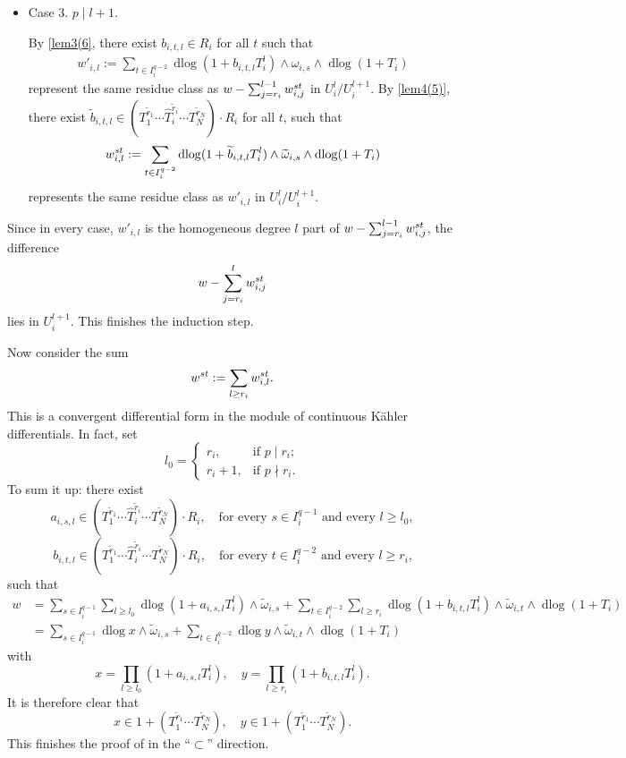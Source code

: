 \documentclass[11pt]{amsart}
\newcommand{\dlog}{\operatorname{dlog}}
\renewcommand{\hat}{\widehat}
\renewcommand{\tilde}{\widetilde}
\theoremstyle{plain}
\theoremstyle{definition}
\numberwithin{equation}{prop}
\begin{document}
\begin{itemize}
\item 
Case 3. $p\mid l+1.$

By \eqref{lem3(6},
there exist $b_{i,t,l}\in R_i$ for all $t$ such that
\begin{align*}
w'_{i,l}:=\sum_{t\in I_i^{q-2}} 
\dlog(1+ b_{i,t,l}T_i^{l})\wedge\omega_{i,s}\wedge 
\dlog (1+T_i)
\end{align*} 
represent the same residue class as $w- \sum_{j=r_i}^{l-1} w_{i,j}^{\rm st}$ in $U_i^{l}/U_i^{l+1}$.
By \eqref{lem4(5)}, 
there exist $\tilde b_{i,t,l}\in 
(T_1^{\tilde r_1}\cdots \hat T_i^{\tilde r_i}\cdots T_N^{\tilde r_N})\cdot R_i$ for all $t$, such that
\begin{align*}
w_{i,l}^{\rm st}:=
\sum_{t\in I_i^{q-2}} 
\dlog(1+\tilde b_{i,t,l}T_i^{l})\wedge\tilde \omega_{i,s}\wedge 
\dlog (1+T_i)
\end{align*}
represents the same residue class as $w'_{i,l}$ in $U_i^{l}/U_i^{l+1}$.
\end{itemize}
Since in every case, $w'_{i,l}$ is the homogeneous degree $l$ part of $w- \sum_{j=r_i}^{l-1} w_{i,j}^{\rm st}$,
the difference
$$w- \sum_{j=r_i}^{l} w_{i,j}^{\rm st}$$
lies in $U_i^{l+1}$. This finishes the induction step.


Now consider the sum
$$w^{\rm st}:=\sum_{l\ge r_i} w_{i,l}^{\rm st}. $$
This is a convergent differential form in the module of continuous Kähler differentials.
In fact, set 
$$l_0=\begin{cases}
    r_i,&\text{if $p\mid r_i$;}
    \\
    r_i+1,&\text{if $p\nmid r_i$.}
\end{cases}$$
To sum it up: there exist
$$a_{i,s,l}\in (T_1^{\tilde r_1}\cdots \hat T_i^{\tilde r_i}\cdots T_N^{\tilde r_N})\cdot R_i,\quad 
\text{for every }s\in I_i^{q-1}\text{ and every  }  l\ge l_0,$$
$$b_{i,t, l}\in (T_1^{\tilde r_1}\cdots \hat T_i^{\tilde r_i}\cdots T_N^{\tilde r_N})\cdot R_i,\quad
\text{for every }t\in I_i^{q-2}\text{ and every $l\ge r_i$,}$$
such that
\begin{align*} 
w&=
\sum_{s\in I_i^{q-1}}\sum_{l\ge l_0} \dlog(1+a_{i,s,l}T_i^{l})\wedge\tilde \omega_{i,s}
+
\sum_{t\in I_i^{q-2}}\sum_{l\ge r_i}
\dlog(1+ b_{i,t,l}T_i^{l})\wedge\tilde \omega_{i,t}\wedge \dlog (1+ T_i)
\\
&=
\sum_{s\in I_i^{q-1}}\dlog x\wedge\tilde \omega_{i,s}
+
\sum_{t\in I_i^{q-2}}
\dlog y
\wedge \tilde \omega_{i,t}\wedge \dlog (1+T_i)
\end{align*}
with
$$x=\prod_{l\ge l_0} (1+a_{i,s,l}T_i^{l}),
\quad 
y=\prod_{l\ge r_i} (1+b_{i,t,l}T_i^{l}).
$$
It is therefore clear that
$$x\in 1+(T_1^{\tilde r_1}\cdots T_N^{\tilde r_N}),
\quad 
y\in 1+(T_1^{\tilde r_1}\cdots  T_N^{\tilde r_N}).$$
This finishes the proof of  in the ``$\subset$'' direction.
\end{document}
